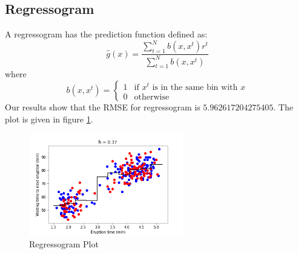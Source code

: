 \documentclass[11pt,reqno]{amsart}
\begin{document}
\subsection{Regressogram}
A regressogram has the prediction function defined as:
\begin{equation}
\hat{g}(x) = \frac{\sum_{t=1}^Nb(x,x^t)r^t}{\sum_{t=1}^Nb(x,x^t)}
\end{equation}
where 
\begin{equation}
b(x,x^t) = 
	\begin{cases} 
      	1 & \text{if } x^t \text{ is in the same bin with } x\\
      	0 & \text{otherwise}
   	\end{cases}
\end{equation}
Our results show that the RMSE for regressogram is $5.962617204275405$. The plot is given in figure \ref{regressogramfig}.
\begin{figure}[ht]
	\centering
	\caption{Regressogram Plot}
	\label{regressogramfig}
	\begin{centering}
		\includegraphics[width=0.6\textwidth]{regressogram.png}
	\end{centering}
\end{figure}
\end{document}
